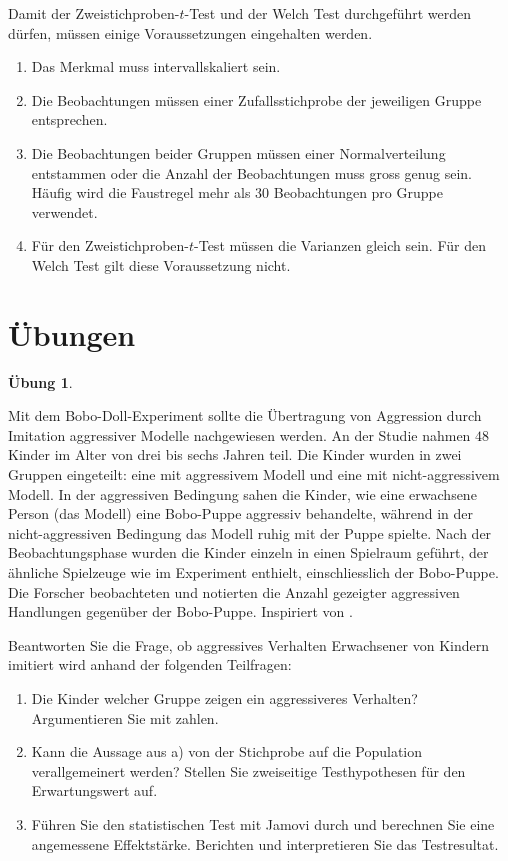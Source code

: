 \documentclass[
]{book}
\providecommand{\tightlist}{%
  \setlength{\itemsep}{0pt}\setlength{\parskip}{0pt}}
\theoremstyle{definition}
\theoremstyle{definition}
\theoremstyle{definition}
\newtheorem{exercise}{Übung}[chapter]
\theoremstyle{definition}
\theoremstyle{remark}
\begin{document}
Damit der Zweistichproben-\(t\)-Test und der Welch Test durchgeführt werden dürfen, müssen einige Voraussetzungen eingehalten werden.

\begin{enumerate}
\def\labelenumi{\arabic{enumi}.}
\tightlist
\item
  Das Merkmal muss intervallskaliert sein.
\item
  Die Beobachtungen müssen einer Zufallsstichprobe der jeweiligen Gruppe entsprechen.
\item
  Die Beobachtungen beider Gruppen müssen einer Normalverteilung entstammen oder die Anzahl der Beobachtungen muss gross genug sein. Häufig wird die Faustregel mehr als \(30\) Beobachtungen pro Gruppe verwendet.
\item
  Für den Zweistichproben-\(t\)-Test müssen die Varianzen gleich sein. Für den Welch Test gilt diese Voraussetzung nicht.
\end{enumerate}

\section{Übungen}\label{uxfcbungen-3}

\begin{exercise}
\protect\hypertarget{exr:bobo2groups}{}\label{exr:bobo2groups}\leavevmode

Mit dem Bobo-Doll-Experiment sollte die Übertragung von Aggression durch Imitation aggressiver Modelle nachgewiesen werden. An der Studie nahmen \(48\) Kinder im Alter von drei bis sechs Jahren teil. Die Kinder wurden in zwei Gruppen eingeteilt: eine mit aggressivem Modell und eine mit nicht-aggressivem Modell. In der aggressiven Bedingung sahen die Kinder, wie eine erwachsene Person (das Modell) eine Bobo-Puppe aggressiv behandelte, während in der nicht-aggressiven Bedingung das Modell ruhig mit der Puppe spielte. Nach der Beobachtungsphase wurden die Kinder einzeln in einen Spielraum geführt, der ähnliche Spielzeuge wie im Experiment enthielt, einschliesslich der Bobo-Puppe. Die Forscher beobachteten und notierten die Anzahl gezeigter aggressiven Handlungen gegenüber der Bobo-Puppe.
Inspiriert von \citet{bandura1961}.

Beantworten Sie die Frage, ob aggressives Verhalten Erwachsener von Kindern imitiert wird anhand der folgenden Teilfragen:

\begin{enumerate}
\def\labelenumi{\alph{enumi})}
\tightlist
\item
  Die Kinder welcher Gruppe zeigen ein aggressiveres Verhalten? Argumentieren Sie mit zahlen.
\item
  Kann die Aussage aus a) von der Stichprobe auf die Population verallgemeinert werden? Stellen Sie zweiseitige Testhypothesen für den Erwartungswert auf.
\item
  Führen Sie den statistischen Test mit Jamovi durch und berechnen Sie eine angemessene Effektstärke. Berichten und interpretieren Sie das Testresultat.
\end{enumerate}

\end{exercise}
\end{document}
